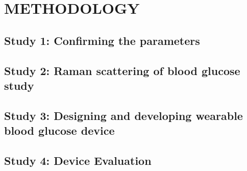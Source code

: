 \setlength{\footskip}{8mm}

\chapter{METHODOLOGY}

\section{Study 1: Confirming the parameters}

\cite{directGlucose}

\section{Study 2: Raman scattering of blood glucose study}
\section{Study 3: Designing and developing wearable blood glucose device}
\section{Study 4: Device Evaluation}